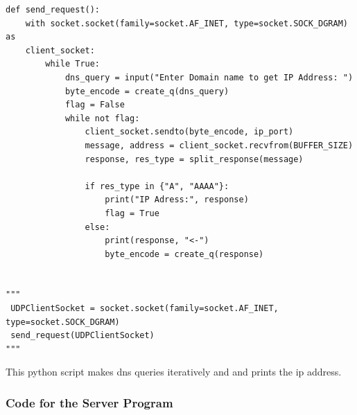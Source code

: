 \documentclass[11pt]{article}
\begin{document}
\begin{verbatim}
def send_request():
    with socket.socket(family=socket.AF_INET, type=socket.SOCK_DGRAM) as 
    client_socket:
        while True:
            dns_query = input("Enter Domain name to get IP Address: ")
            byte_encode = create_q(dns_query)
            flag = False
            while not flag:
                client_socket.sendto(byte_encode, ip_port)
                message, address = client_socket.recvfrom(BUFFER_SIZE)
                response, res_type = split_response(message)

                if res_type in {"A", "AAAA"}:
                    print("IP Adress:", response)
                    flag = True
                else:
                    print(response, "<-")
                    byte_encode = create_q(response)


"""
 UDPClientSocket = socket.socket(family=socket.AF_INET, type=socket.SOCK_DGRAM)
 send_request(UDPClientSocket)
"""
\end{verbatim}
This python script makes dns queries iteratively and and prints the ip address.



\subsubsection{Code for the Server Program}
\end{document}
